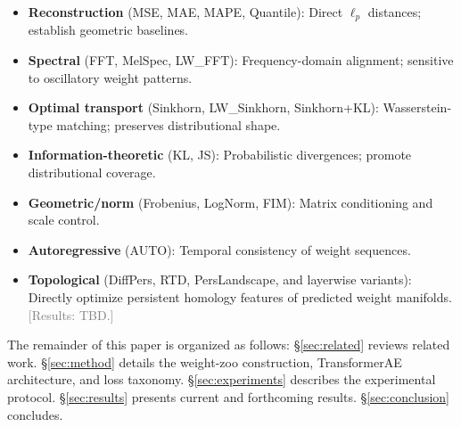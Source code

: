 \begin{itemize}
    \item \textbf{Reconstruction} (MSE, MAE, MAPE, Quantile): Direct $\ell_p$ distances; establish geometric baselines.
    \item \textbf{Spectral} (FFT, MelSpec, LW\_FFT): Frequency-domain alignment; sensitive to oscillatory weight patterns.
    \item \textbf{Optimal transport} (Sinkhorn, LW\_Sinkhorn, Sinkhorn+KL): Wasserstein-type matching; preserves distributional shape.
    \item \textbf{Information-theoretic} (KL, JS): Probabilistic divergences; promote distributional coverage.
    \item \textbf{Geometric/norm} (Frobenius, LogNorm, FIM): Matrix conditioning and scale control.
    \item \textbf{Autoregressive} (AUTO): Temporal consistency of weight sequences.
    \item \textbf{Topological} (DiffPers, RTD, PersLandscape, and layerwise variants): Directly optimize persistent homology features of predicted weight manifolds. \textcolor{gray}{[Results: TBD.]}
\end{itemize}

The remainder of this paper is organized as follows: \S\ref{sec:related} reviews related work. \S\ref{sec:method} details the weight-zoo construction, TransformerAE architecture, and loss taxonomy. \S\ref{sec:experiments} describes the experimental protocol. \S\ref{sec:results} presents current and forthcoming results. \S\ref{sec:conclusion} concludes.
